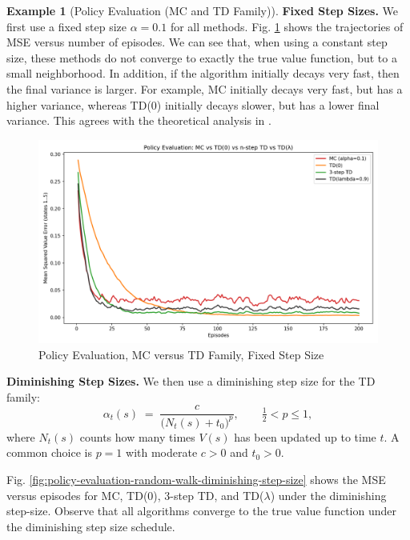 \documentclass[
]{book}
\theoremstyle{definition}
\theoremstyle{definition}
\newtheorem{example}{Example}[chapter]
\theoremstyle{definition}
\theoremstyle{definition}
\theoremstyle{remark}
\begin{document}
\begin{example}[Policy Evaluation (MC and TD Family)]
\textbf{Fixed Step Sizes.}
We first use a fixed step size \(\alpha=0.1\) for all methods. Fig. \ref{fig:policy-evaluation-random-walk-fixed-step-size} shows the trajectories of MSE versus number of episodes. We can see that, when using a constant step size, these methods do not converge to exactly the true value function, but to a small neighborhood. In addition, if the algorithm initially decays very fast, then the final variance is larger. For example, MC initially decays very fast, but has a higher variance, whereas TD(0) initially decays slower, but has a lower final variance. This agrees with the theoretical analysis in \citep{kearns2000bias}.

\begin{figure}

{\centering \includegraphics[width=0.9\linewidth]{images/Value-RL/mc_td_comparison_constant_step} 

}

\caption{Policy Evaluation, MC versus TD Family, Fixed Step Size}\label{fig:policy-evaluation-random-walk-fixed-step-size}
\end{figure}

\textbf{Diminishing Step Sizes.}
We then use a diminishing step size for the TD family:
\begin{equation}
\alpha_t(s) \;=\; \frac{c}{\big(N_t(s)+t_0\big)^p}, 
\qquad \tfrac{1}{2} < p \le 1,
\label{eq:per-state-decay}
\end{equation}
where \(N_t(s)\) counts how many times \(V(s)\) has been updated up to time \(t\). A common choice is \(p=1\) with moderate \(c>0\) and \(t_0>0\).

Fig. \ref{fig:policy-evaluation-random-walk-diminishing-step-size} shows the MSE versus episodes for MC, TD(0), 3-step TD, and TD(\(\lambda\)) under the diminishing step-size. Observe that all algorithms converge to the true value function under the diminishing step size schedule.


\end{example}
\end{document}
